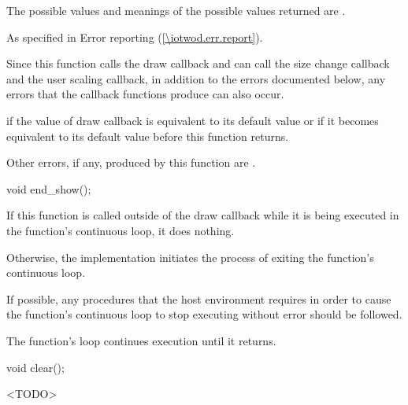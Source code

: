 \begin{itemdescr}
\pnum
\returns
The possible values and meanings of the possible values returned are .

\pnum
\throws
As specified in Error reporting (\ref{\iotwod.err.report}).

\pnum
\remarks
Since this function calls the draw callback and can call the size change callback and the user scaling callback, in addition to the errors documented below, any errors that the callback functions produce can also occur.

\pnum
\errors
{} if the value of draw callback is equivalent to its default value or if it becomes equivalent to its default value before this function returns.

\pnum
Other errors, if any, produced by this function are .
\end{itemdescr}

%
\begin{itemdecl}
void end_show();
\end{itemdecl}
\begin{itemdescr}
\pnum
\effects
If this function is called outside of the draw callback while it is being executed in the  function's continuous loop, it does nothing.

\pnum
Otherwise, the implementation initiates the process of exiting the  function's continuous loop.

\pnum
If possible, any procedures that the host environment requires in order to cause the  function's continuous loop to stop executing without error should be followed.

\pnum
The  function's loop continues execution until it returns.
\end{itemdescr}

%
\begin{itemdecl}
void clear();
\end{itemdecl}
\begin{itemdescr}
\pnum
\effects
<TODO>
\end{itemdescr}


